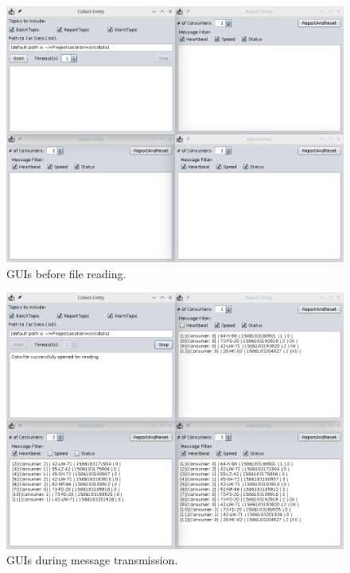 \documentclass[12pt]{article}
\begin{document}
\begin{figure}[H]
  \centering
  \begin{minipage}{\textwidth}
    \centering
    \includegraphics[width=.85\linewidth]{img/GUI_1.png}
  \end{minipage}%
  \caption{GUIs before file reading.}
  \label{GUI_1}
\end{figure} 

\begin{figure}[H]
  \centering
  \begin{minipage}{\textwidth}
    \centering
    \includegraphics[width=.85\linewidth]{img/GUI_2.png}
  \end{minipage}%
  \caption{GUIs during message transmission.}
  \label{GUI_2}
\end{figure} 
\end{document}
